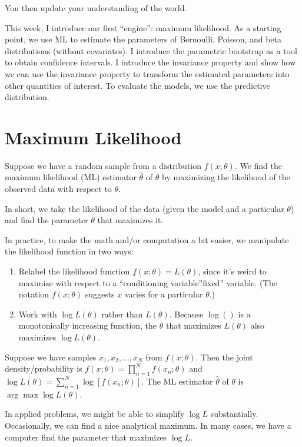 \documentclass[
]{book}
\providecommand{\tightlist}{%
  \setlength{\itemsep}{0pt}\setlength{\parskip}{0pt}}
\begin{document}
You then update your understanding of the world.

This week, I introduce our first ``engine'': maximum likelihood. As a starting point, we use ML to estimate the parameters of Bernoulli, Poisson, and beta distributions (without covariates). I introduce the parametric bootstrap as a tool to obtain confidence intervals. I introduce the invariance property and show how we can use the invariance property to transform the estimated parameters into other quantities of interest. To evaluate the models, we use the predictive distribution.

\hypertarget{maximum-likelihood}{%
\section{Maximum Likelihood}\label{maximum-likelihood}}

Suppose we have a random sample from a distribution \(f(x; \theta)\). We find the maximum likelihood (ML) estimator \(\hat{\theta}\) of \(\theta\) by maximizing the likelihood of the observed data with respect to \(\theta\).

In short, we take the likelihood of the data (given the model and a particular \(\theta\)) and find the parameter \(\theta\) that maximizes it.

In practice, to make the math and/or computation a bit easier, we manipulate the likelihood function in two ways:

\begin{enumerate}
\def\labelenumi{\arabic{enumi}.}
\tightlist
\item
  Relabel the likelihood function \(f(x; \theta) = L(\theta)\), since it's weird to maximize with respect to a ``conditioning variable''fixed'' variable. (The notation \(f(x; \theta)\) suggests \(x\) varies for a particular \(\theta\).)
\item
  Work with \(\log L(\theta)\) rather than \(L(\theta)\). Because \(\log()\) is a monotonically increasing function, the \(\theta\) that maximizes \(L(\theta)\) also maximizes \(\log L(\theta)\).
\end{enumerate}

Suppose we have samples \(x_1, x_2, ..., x_N\) from \(f(x; \theta)\). Then the joint density/probability is \(f(x; \theta) = \prod_{n = 1}^N f(x_n; \theta)\) and \(\log L(\theta) = \sum_{n = 1}^N \log \left[ f(x_n; \theta) \right]\). The ML estimator \(\hat{\theta}\) of \(\theta\) is \(\arg \max \log L(\theta)\).

In applied problems, we might be able to simplify \(\log L\) substantially. Occasionally, we can find a nice analytical maximum. In many cases, we have a computer find the parameter that maximizes \(\log L\).
\end{document}
